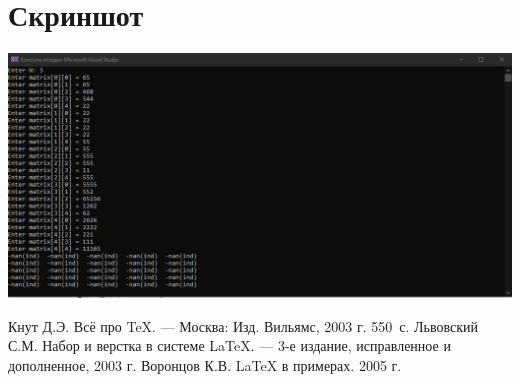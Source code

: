 \documentclass[12pt,a4paper]{scrartcl}
\begin{document}
\section {Скриншот}
\includegraphics{skrin.png}

\label{sec:exp}

\begin{thebibliography}{9}
Кнут Д.Э. Всё про \TeX. \newblock --- Москва: Изд. Вильямс, 2003 г. 550~с.
Львовский С.М. Набор и верстка в системе \LaTeX{}. \newblock --- 3-е издание, исправленное и дополненное, 2003 г.
Воронцов К.В. \LaTeX{} в примерах. 2005 г.
\end{thebibliography}
\end{document}
